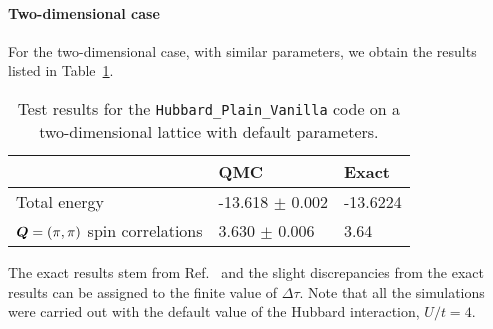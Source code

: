 \paragraph*{Two-dimensional case}  
For the two-dimensional case,   with similar parameters, we obtain the results listed in Table~\ref{tab:2dplain}.
\begin{table}[h!]
\begin{center}
\begin{tabular}{l l l}
\toprule
             &  QMC  & Exact  \\ \midrule
Total energy & -13.618   $\pm $  0.002 &  -13.6224  \\
 $\boldsymbol{Q}=(\pi,\pi)$ spin correlations &  \phantom{-1}3.630     $ \pm $   0.006     & \phantom{-1}3.64 \\ 
 \bottomrule
\end{tabular}
\caption{Test results for the \texttt{Hubbard\_Plain\_Vanilla} code on a two-dimensional lattice with default parameters.} \label{tab:2dplain}
\end{center}
\end{table}
The exact results stem from Ref.~\cite{Parola91}     and the slight discrepancies from the exact results can be  assigned to the finite value of $\Delta \tau$.  Note that all the simulations were carried out with the default value of the Hubbard interaction, $U/t =4$. 

